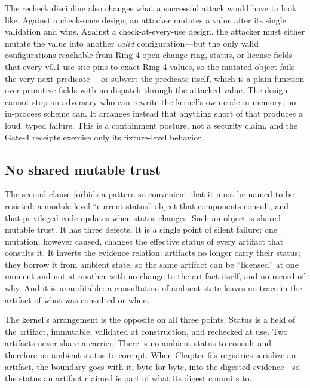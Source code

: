 \begin{remark}
The recheck discipline also changes what a successful attack would have to
look like. Against a check-once design, an attacker mutates a value after
its single validation and wins. Against a check-at-every-use design, the
attacker must either mutate the value into another \emph{valid}
configuration---but the only valid configurations reachable from Ring-4 open
change ring, status, or license fields that every v0.1 use site pins to
exact Ring-4 values, so the mutated object fails the very next predicate---
or subvert the predicate itself, which is a plain function over primitive
fields with no dispatch through the attacked value. The design cannot stop
an adversary who can rewrite the kernel's own code in memory; no in-process
scheme can. It arranges instead that anything short of that produces a loud,
typed failure. This is a containment posture, not a security claim, and the
Gate-4 receipts exercise only its fixture-level behavior.
\end{remark}

\subsection{No shared mutable trust}

The second clause forbids a pattern so convenient that it must be named to be
resisted: a module-level ``current status'' object that components consult,
and that privileged code updates when status changes. Such an object is
shared mutable trust. It has three defects. It is a single point of silent
failure: one mutation, however caused, changes the effective status of every
artifact that consults it. It inverts the evidence relation: artifacts no
longer carry their status; they borrow it from ambient state, so the same
artifact can be ``licensed'' at one moment and not at another with no change
to the artifact itself, and no record of why. And it is unauditable: a
consultation of ambient state leaves no trace in the artifact of what was
consulted or when.

The kernel's arrangement is the opposite on all three points. Status is a
field of the artifact, immutable, validated at construction, and rechecked at
use. Two artifacts never share a carrier. There is no ambient status to
consult and therefore no ambient status to corrupt. When Chapter 6's
registries serialize an artifact, the boundary goes with it, byte for byte,
into the digested evidence---so the status an artifact claimed is part of
what its digest commits to.

